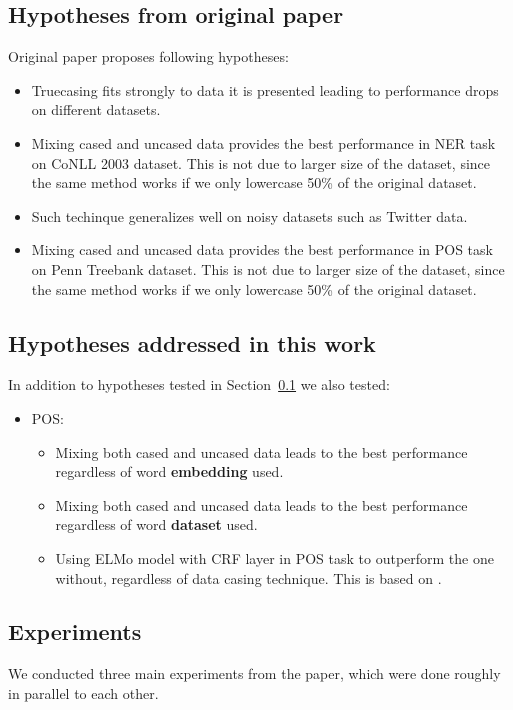 \documentclass[11pt,a4paper]{article}
\begin{document}
\subsection{Hypotheses from original paper}
\label{sec:original_hypotheses}
Original paper proposes following hypotheses:
\begin{itemize}
    \item Truecasing fits strongly to data it is presented leading to performance drops on different datasets.
    \item Mixing cased and uncased data provides the best performance in NER task on CoNLL 2003 dataset. This is not due to larger size of the dataset, since the same method works if we only lowercase 50\% of the original dataset.
    \item Such techinque generalizes well on noisy datasets such as Twitter data.
    \item Mixing cased and uncased data provides the best performance in POS task on Penn Treebank dataset. This is not due to larger size of the dataset, since the same method works if we only lowercase 50\% of the original dataset.
\end{itemize}

\subsection{Hypotheses addressed in this work}
\label{sec:current_hypotheses}
In addition to hypotheses tested in Section~\ref{sec:original_hypotheses} we also tested:
\begin{itemize}
    \item POS:
    \begin{itemize}
        \item Mixing both cased and uncased data leads to the best performance regardless of word \textbf{embedding} used.
        \item Mixing both cased and uncased data leads to the best performance regardless of word \textbf{dataset} used.
        \item Using ELMo model with CRF layer in POS task to outperform the one without, regardless of data casing technique. This is based on \cite{BiLSTM-CRF}.
    \end{itemize}
\end{itemize}


\subsection{Experiments}
We conducted three main experiments from the paper, which were done roughly in parallel to each other.
\end{document}
